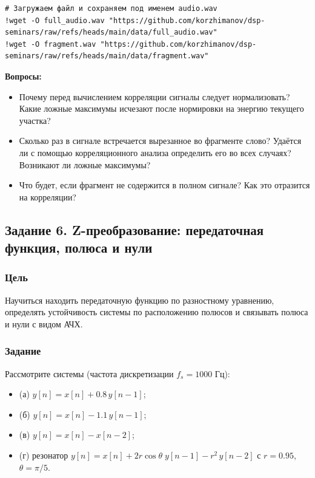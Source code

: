 \documentclass[12pt,a4paper,openany]{book}
\providecommand{\tightlist}{\setlength{\itemsep}{0pt}\setlength{\parskip}{0pt}}
\begin{document}
\begin{Verbatim}[fontsize=\small, breaklines, breakanywhere, frame=single, framesep=2mm]
# Загружаем файл и сохраняем под именем audio.wav
!wget -O full_audio.wav "https://github.com/korzhimanov/dsp-seminars/raw/refs/heads/main/data/full_audio.wav"
!wget -O fragment.wav "https://github.com/korzhimanov/dsp-seminars/raw/refs/heads/main/data/fragment.wav"
\end{Verbatim}

\textbf{Вопросы:}

\begin{itemize}
\tightlist
\item
  Почему перед вычислением корреляции сигналы следует нормализовать? Какие ложные максимумы исчезают после нормировки на энергию текущего участка?
\item
  Сколько раз в сигнале встречается вырезанное во фрагменте слово? Удаётся ли с помощью корреляционного анализа определить его во всех случаях? Возникают ли ложные максимумы?
\item
  Что будет, если фрагмент не содержится в полном сигнале? Как это отразится на корреляции?
\end{itemize}

\subsection*{Задание 6. Z-преобразование: передаточная функция, полюса и нули}

\subsubsection*{Цель}

Научиться находить передаточную функцию по разностному уравнению, определять устойчивость системы по расположению полюсов и связывать полюса и нули с видом АЧХ.

\subsubsection*{Задание}

Рассмотрите системы (частота дискретизации \(f_s = 1000\) Гц):

\begin{itemize}
\tightlist
\item
  (а) \(y[n] = x[n] + 0.8\,y[n-1]\);
\item
  (б) \(y[n] = x[n] - 1.1\,y[n-1]\);
\item
  (в) \(y[n] = x[n] - x[n-2]\);
\item
  (г) резонатор \(y[n] = x[n] + 2r\cos\theta\;y[n-1] - r^2\,y[n-2]\) с \(r = 0.95\), \(\theta = \pi/5\).
\end{itemize}
\end{document}

